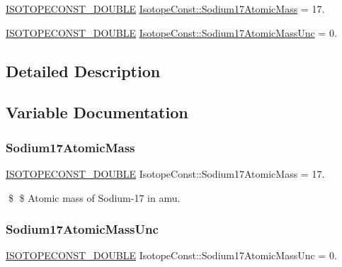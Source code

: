 \begin{DoxyCompactItemize}
\item 
\mbox{\hyperlink{group___isotope_const-_macros_ga8f45a7272ce02c0b4c65c44636ed719a}{I\+S\+O\+T\+O\+P\+E\+C\+O\+N\+S\+T\+\_\+\+D\+O\+U\+B\+LE}} \mbox{\hyperlink{group___isotope_const-_sodium-_na17_gaa7adc3e24d62ef50924a4b6f478086b1}{Isotope\+Const\+::\+Sodium17\+Atomic\+Mass}} = 17.
\item 
\mbox{\hyperlink{group___isotope_const-_macros_ga8f45a7272ce02c0b4c65c44636ed719a}{I\+S\+O\+T\+O\+P\+E\+C\+O\+N\+S\+T\+\_\+\+D\+O\+U\+B\+LE}} \mbox{\hyperlink{group___isotope_const-_sodium-_na17_ga882f05d1dd55fc050b8353c969a74bf3}{Isotope\+Const\+::\+Sodium17\+Atomic\+Mass\+Unc}} = 0.
\end{DoxyCompactItemize}


\subsection{Detailed Description}


\subsection{Variable Documentation}
\mbox{\label{group___isotope_const-_sodium-_na17_gaa7adc3e24d62ef50924a4b6f478086b1}} 
\subsubsection{\texorpdfstring{Sodium17\+Atomic\+Mass}{Sodium17AtomicMass}}
{\footnotesize\ttfamily \mbox{\hyperlink{group___isotope_const-_macros_ga8f45a7272ce02c0b4c65c44636ed719a}{I\+S\+O\+T\+O\+P\+E\+C\+O\+N\+S\+T\+\_\+\+D\+O\+U\+B\+LE}} Isotope\+Const\+::\+Sodium17\+Atomic\+Mass = 17.}

\$ \$ Atomic mass of Sodium-\/17 in amu. \mbox{\label{group___isotope_const-_sodium-_na17_ga882f05d1dd55fc050b8353c969a74bf3}} 
\subsubsection{\texorpdfstring{Sodium17\+Atomic\+Mass\+Unc}{Sodium17AtomicMassUnc}}
{\footnotesize\ttfamily \mbox{\hyperlink{group___isotope_const-_macros_ga8f45a7272ce02c0b4c65c44636ed719a}{I\+S\+O\+T\+O\+P\+E\+C\+O\+N\+S\+T\+\_\+\+D\+O\+U\+B\+LE}} Isotope\+Const\+::\+Sodium17\+Atomic\+Mass\+Unc = 0.}

